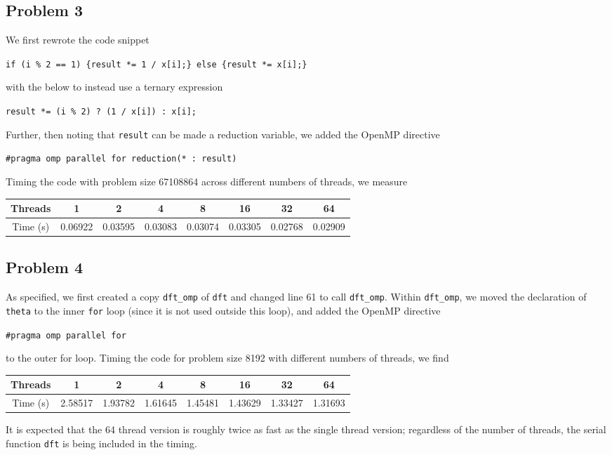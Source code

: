 \documentclass{article}
\begin{document}
  \subsection*{Problem 3}
  We first rewrote the code snippet
  \begin{center}
    \texttt{if (i \% 2 == 1) \{result *= 1 / x[i];\} else \{result *= x[i];\}}
  \end{center}
  with the below to instead use a ternary expression
  \begin{center}
    \texttt{result *= (i \% 2) ? (1 / x[i]) : x[i];}
  \end{center}
  Further, then noting that \texttt{result} can be made a reduction variable, we added the OpenMP directive
  \begin{center}
    \texttt{\#pragma omp parallel for reduction(* : result)}
  \end{center}
  Timing the code with problem size 67108864 across different numbers of threads, we measure
  \begin{center}
    \begin{tabular}{ |c|c|c|c|c|c|c|c| }
     \hline
     Threads & 1 & 2 & 4 & 8 & 16 & 32 & 64 \\
     \hline
     Time (s) & 0.06922 & 0.03595 & 0.03083 & 0.03074 & 0.03305 & 0.02768 & 0.02909 \\
     \hline
    \end{tabular}
  \end{center}

  \subsection*{Problem 4}
  As specified, we first created a copy \texttt{dft\_omp} of \texttt{dft} and changed line 61 to call \texttt{dft\_omp}. Within \texttt{dft\_omp}, we moved the declaration of \texttt{theta} to the inner \texttt{for} loop (since it is not used outside this loop), and added the OpenMP directive
  \begin{center}
    \texttt{\#pragma omp parallel for}
  \end{center}
  to the outer for loop. Timing the code for problem size 8192 with different numbers of threads, we find
  \begin{center}
    \begin{tabular}{ |c|c|c|c|c|c|c|c| }
     \hline
     Threads & 1 & 2 & 4 & 8 & 16 & 32 & 64 \\
     \hline
     Time (s) & 2.58517 & 1.93782 & 1.61645 & 1.45481 & 1.43629 & 1.33427 & 1.31693 \\
     \hline
    \end{tabular}
  \end{center}
  It is expected that the 64 thread version is roughly twice as fast as the single thread version; regardless of the number of threads, the serial function \texttt{dft} is being included in the timing.
\end{document}
